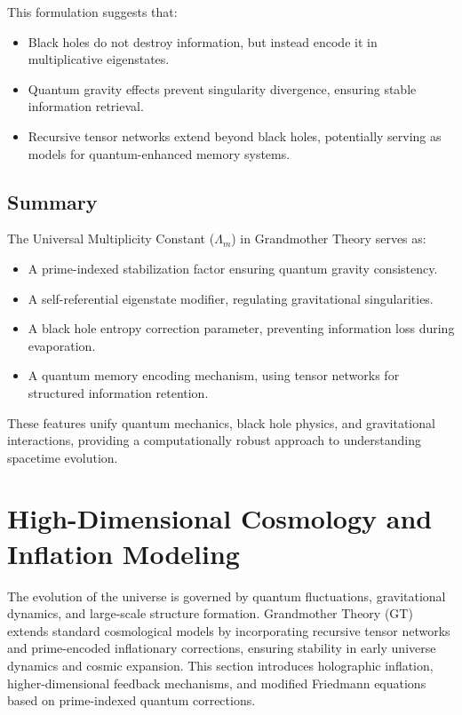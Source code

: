 \documentclass{article}
\theoremstyle{plain}
\begin{document}
This formulation suggests that:
\begin{itemize}
    \item Black holes do not destroy information, but instead encode it in multiplicative eigenstates.
    \item Quantum gravity effects prevent singularity divergence, ensuring stable information retrieval.
    \item Recursive tensor networks extend beyond black holes, potentially serving as models for quantum-enhanced memory systems.
\end{itemize}

\subsection{Summary}
The Universal Multiplicity Constant ($\Lambda_m$) in Grandmother Theory serves as:
\begin{itemize}
    \item A prime-indexed stabilization factor ensuring quantum gravity consistency.
    \item A self-referential eigenstate modifier, regulating gravitational singularities.
    \item A black hole entropy correction parameter, preventing information loss during evaporation.
    \item A quantum memory encoding mechanism, using tensor networks for structured information retention.
\end{itemize}

These features unify quantum mechanics, black hole physics, and gravitational interactions, providing a computationally robust approach to understanding spacetime evolution.

\section{High-Dimensional Cosmology and Inflation Modeling}

The evolution of the universe is governed by quantum fluctuations, gravitational dynamics, and large-scale structure formation. Grandmother Theory (GT) extends standard cosmological models by incorporating recursive tensor networks and prime-encoded inflationary corrections, ensuring stability in early universe dynamics and cosmic expansion. This section introduces holographic inflation, higher-dimensional feedback mechanisms, and modified Friedmann equations based on prime-indexed quantum corrections.
\end{document}
